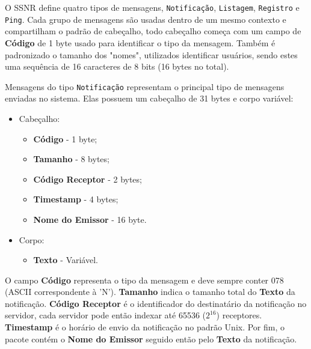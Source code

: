 \documentclass[12pt]{article}
\begin{document}
O SSNR define quatro tipos de mensagens,
{\tt Notificação}, {\tt Listagem}, {\tt Registro} e {\tt Ping}.
Cada grupo de mensagens são usadas dentro de um mesmo contexto e compartilham o padrão de cabeçalho,
todo cabeçalho começa com um campo de {\bf Código} de 1 byte usado para identificar o tipo da mensagem.
Também é padronizado o tamanho dos "nomes", utilizados identificar usuários,
sendo estes uma sequência de 16 caracteres de 8 bits (16 bytes no total).

Mensagens do tipo {\tt Notificação} representam o principal tipo de mensagens enviadas no sistema.
Elas possuem um cabeçalho de 31 bytes e corpo variável:
\begin{itemize}
\item Cabeçalho:
	\begin{itemize}
	\item {\bf Código} - 1 byte;
	\item {\bf Tamanho} - 8 bytes;
	\item {\bf Código Receptor} - 2 bytes;
	\item {\bf Timestamp} - 4 bytes;
	\item {\bf Nome do Emissor} - 16 byte.
	\end{itemize}
\item Corpo:
	\begin{itemize}
	\item {\bf Texto} - Variável.
	\end{itemize}
\end{itemize}
O campo {\bf Código} representa o tipo da mensagem e deve sempre conter 078 (ASCII correspondente à 'N').
{\bf Tamanho} indica o tamanho total do {\bf Texto} da notificação.
{\bf Código Receptor} é o identificador do destinatário da notificação no servidor,
cada servidor pode então indexar até 65536 ($2^{16}$) receptores.
{\bf Timestamp} é o horário de envio da notificação no padrão Unix.
Por fim, o pacote contém o {\bf Nome do Emissor} seguido então pelo {\bf Texto} da notificação.
\end{document}
